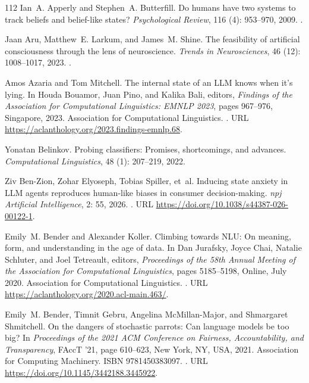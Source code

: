 \begin{thebibliography}{112}
Ian~A. Apperly and Stephen~A. Butterfill.
\newblock Do humans have two systems to track beliefs and belief-like states?
\newblock \emph{Psychological Review}, 116 (4): 953--970, 2009.
\newblock {}.

Jaan Aru, Matthew~E. Larkum, and James~M. Shine.
\newblock The feasibility of artificial consciousness through the lens of neuroscience.
\newblock \emph{Trends in Neurosciences}, 46 (12): 1008--1017, 2023.
\newblock {}.

Amos Azaria and Tom Mitchell.
\newblock The internal state of an {LLM} knows when it's lying.
\newblock In Houda Bouamor, Juan Pino, and Kalika Bali, editors, \emph{Findings of the Association for Computational Linguistics: EMNLP 2023}, pages 967--976, Singapore, 2023. Association for Computational Linguistics.
\newblock {}.
\newblock URL \url{https://aclanthology.org/2023.findings-emnlp.68}.

Yonatan Belinkov.
\newblock Probing classifiers: Promises, shortcomings, and advances.
\newblock \emph{Computational Linguistics}, 48 (1): 207--219, 2022.

Ziv Ben-Zion, Zohar Elyoseph, Tobias Spiller, et~al.
\newblock Inducing state anxiety in {LLM} agents reproduces human-like biases in consumer decision-making.
\newblock \emph{npj Artificial Intelligence}, 2: 55, 2026.
\newblock {}.
\newblock URL \url{https://doi.org/10.1038/s44387-026-00122-1}.

Emily~M. Bender and Alexander Koller.
\newblock Climbing towards {NLU}: {On} meaning, form, and understanding in the age of data.
\newblock In Dan Jurafsky, Joyce Chai, Natalie Schluter, and Joel Tetreault, editors, \emph{Proceedings of the 58th Annual Meeting of the Association for Computational Linguistics}, pages 5185--5198, Online, July 2020. Association for Computational Linguistics.
\newblock {}.
\newblock URL \url{https://aclanthology.org/2020.acl-main.463/}.

Emily~M. Bender, Timnit Gebru, Angelina McMillan-Major, and Shmargaret Shmitchell.
\newblock On the dangers of stochastic parrots: Can language models be too big?
\newblock In \emph{Proceedings of the 2021 ACM Conference on Fairness, Accountability, and Transparency}, FAccT '21, page 610–623, New York, NY, USA, 2021. Association for Computing Machinery.
\newblock ISBN 9781450383097.
\newblock {}.
\newblock URL \url{https://doi.org/10.1145/3442188.3445922}.


\end{thebibliography}
